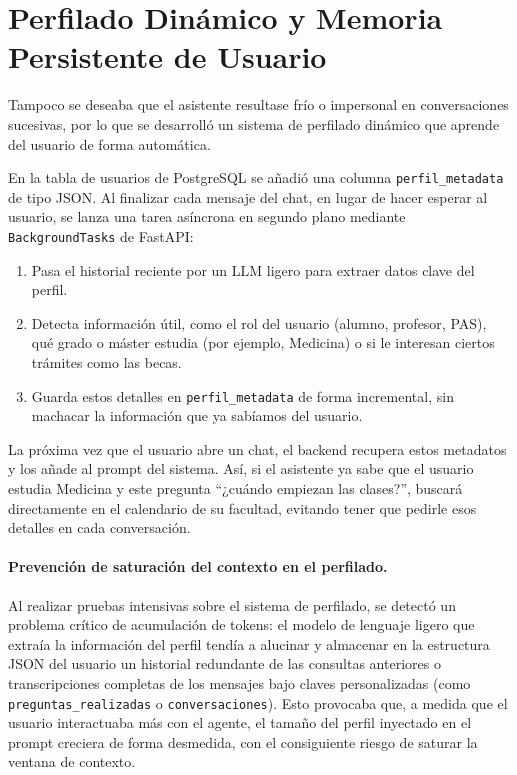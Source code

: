 \documentclass[12pt,a4paper,oneside]{report}
\begin{document}
\section{Perfilado Dinámico y Memoria Persistente de Usuario}

Tampoco se deseaba que el asistente resultase frío o impersonal en conversaciones sucesivas, por lo que se desarrolló un sistema de perfilado dinámico que aprende del usuario de forma automática.

En la tabla de usuarios de PostgreSQL se añadió una columna \texttt{perfil\_metadata} de tipo JSON. Al finalizar cada mensaje del chat, en lugar de hacer esperar al usuario, se lanza una tarea asíncrona en segundo plano mediante \texttt{BackgroundTasks} de FastAPI:
\begin{enumerate}
    \item Pasa el historial reciente por un LLM ligero para extraer datos clave del perfil.
    \item Detecta información útil, como el rol del usuario (alumno, profesor, PAS), qué grado o máster estudia (por ejemplo, Medicina) o si le interesan ciertos trámites como las becas.
    \item Guarda estos detalles en \texttt{perfil\_metadata} de forma incremental, sin machacar la información que ya sabíamos del usuario.
\end{enumerate}

La próxima vez que el usuario abre un chat, el backend recupera estos metadatos y los añade al prompt del sistema. Así, si el asistente ya sabe que el usuario estudia Medicina y este pregunta ``¿cuándo empiezan las clases?'', buscará directamente en el calendario de su facultad, evitando tener que pedirle esos detalles en cada conversación.

\paragraph{Prevención de saturación del contexto en el perfilado.} Al realizar pruebas intensivas sobre el sistema de perfilado, se detectó un problema crítico de acumulación de tokens: el modelo de lenguaje ligero que extraía la información del perfil tendía a alucinar y almacenar en la estructura JSON del usuario un historial redundante de las consultas anteriores o transcripciones completas de los mensajes bajo claves personalizadas (como \texttt{preguntas\_realizadas} o \texttt{conversaciones}). Esto provocaba que, a medida que el usuario interactuaba más con el agente, el tamaño del perfil inyectado en el prompt creciera de forma desmedida, con el consiguiente riesgo de saturar la ventana de contexto.
\end{document}
